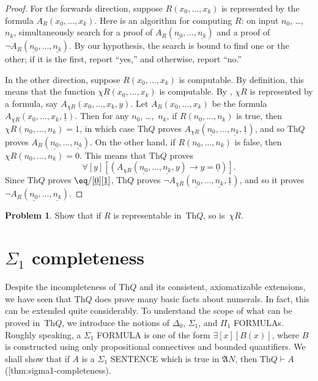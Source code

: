 \documentclass[10pt,a4paper]{article}
\makeatletter
\newcommand*{\olup}[1]{\MakeUppercase{#1}}
\theoremstyle{plain}
\theoremstyle{definition}
\newtheorem{prob}{Problem}[section]
\theoremstyle{remark}
\newcommand*{\olfileid}[3]{}
\newcommand*{\olsection}[1]{\section*{#1}}
\newcommand{\olref}{\@ifnextchar[{\olref@i}{\olref@final}}
\def\olref@i[#1]{\@ifnextchar[{\olref@ii}{\olref@final}}
\def\olref@ii[#1]{\@ifnextchar[{\olref@iii}{\olref@final}}
\def\olref@iii[#1]{\olref@final}
\def\olref@final#1{\ref{#1}}
\providecommand{\lif}{\mathbin{\rightarrow}}
\providecommand{\lforall}{\mathord{\forall}}
\providecommand{\lexists}{\mathord{\exists}}
\providecommand{\Proves}{\mathrel{\vdash}}
\providecommand{\Struct}{\ensuremath{\mathfrak{A}}}
\providecommand{\Th}{\ensuremath{\mathrm{Th}}}
\providecommand{\num}[1]{\underline{#1}}
\providecommand{\Char}{\chi}
\makeatother
\begin{document}
\begin{proof}
For the forwards direction, suppose $R(x_0,\dots,x_k)$ is
represented by the formula $A_R(x_0,\dots,x_k)$. Here is an
algorithm for computing $R$: on input $n_0$, \dots,~$n_k$, simultaneously
search for a proof of $A_R(\num{n_0}, \dots, \num{n_k})$ and a proof of
$\lnot A_R(\num{n_0}, \dots, \num{n_k})$. By our hypothesis, the search
is bound to find one or the other; if it is the first, report ``yes,''
and otherwise, report ``no.''

In the other direction, suppose $R(x_0, \dots, x_k)$ is computable. By
definition, this means that the function $\Char{R}(x_0, \dots, x_k)$
is computable. By \olref[int]{thm:representable-iff-comp}, $\Char{R}$
is represented by a formula, say $A_{\Char{R}}(x_0, \dots, x_k,
y)$. Let $A_R(x_0, \dots, x_k)$ be the formula $A_{\Char{R}}(x_0,
\dots, x_k, \num{1})$. Then for any $n_0$, \dots,~$n_k$, if $R(n_0,
\dots, n_k)$ is true, then $\Char{R}(n_0, \dots, n_k) = 1$, in which
case $\Th{Q}$ proves $A_{\Char{R}}(\num{n_0}, \dots, \num{n_k},
\num{1})$, and so $\Th{Q}$ proves $A_R(\num{n_0}, \dots,
\num{n_k})$. On the other hand, if $R(n_0, \dots, n_k)$ is false, then
$\Char{R}(n_0, \dots, n_k) = 0$. This means that $\Th{Q}$ proves
\[
\lforall[y][(A_{\Char{R}}(\num{n_0}, \dots, \num{n_k}, y) \lif y =
  \num{0})].
\]
Since $\Th{Q}$ proves $\eq/[\num{0}][\num{1}]$, $\Th{Q}$ proves
$\lnot A_{\Char{R}}(\num{n_0}, \dots, \num{n_k}, \num{1})$, and so it
proves $\lnot A_R(\num{n_0}, \dots, \num{n_k})$.
\end{proof}

\begin{prob}
Show that if $R$ is representable in~$\Th{Q}$, so is~$\Char{R}$.
\end{prob}





\olfileid{inc}{inp}{s1c}
\olsection{\texorpdfstring{$\Sigma_1$}{Sigma-1} completeness}

Despite the incompleteness of $\Th{Q}$ and its consistent, axiomatizable
extensions, we have seen that $\Th{Q}$ does prove many basic facts about
numerals. In fact, this can be extended quite considerably. To understand
the scope of what can be proved in~$\Th{Q}$, we introduce the notions of
$\Delta_0$, $\Sigma_1$, and $\Pi_1$ \olup{formula}s. Roughly speaking, a
$\Sigma_1$ \olup{formula} is one of the form $\lexists[x][B(x)]$, where $B$
is constructed using only propositional connectives and bounded
quantifiers. We shall show that if $A$ is a $\Sigma_1$ \olup{sentence}
which is true in $\Struct{N}$, then $\Th{Q} \Proves A$
(\olref{thm:sigma1-completeness}).
\end{document}
